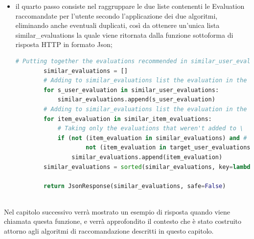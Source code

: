 \begin{itemize}
\begin{lstlisting}[language=Python, label=lst:CF_Hybrid_Evaluation_4]
		similar_item_evaluations = []
		for t_user_evaluation in target_user_evaluations:  # for every target user's evaluations
			for item_evaluation in item_recommendation_alg(t_user_evaluation['other_id']):  # is applied the item_recommendation algorithm
				# Taking only the evaluations that have: different other_id (excluding the target evaluation
				# in the recommendation) and same parent_id and the evaluations that weren't added to 'similar_item_evaluations'
				# list or to 'similar_user_evaluations' or to 'target_user_evaluations'
				if ((t_user_evaluation['other_id'] != item_evaluation['other_id']) and # Evaluations must have different 'id'
						(t_user_evaluation['parent_id'] == item_evaluation['parent_id']) and # Evaluations must have the same 'parent_id'
						# Evaluation in all_other_evals list mustn't be already added to \
						not (item_evaluation in similar_item_evaluations) and # the 'similar_item_evaluations' list,
						not (item_evaluation in similar_user_evaluations) and # the 'similar_user_evaluations' list or
						not (item_evaluation in target_user_evaluations)): # the 'target_user_evaluations' list
					similar_item_evaluations.append(item_evaluation)
	\end{lstlisting} 
	\item il quarto passo consiste nel raggruppare le due liste contenenti le Evaluation raccomandate per l'utente secondo l'applicazione dei
	due algoritmi, eliminando anche eventuali duplicati, così da ottenere un'unica lista similar\_evaluations la quale viene ritornata dalla 
	funzione sottoforma di risposta HTTP in formato Json;
	\begin{lstlisting}[language=Python, label=lst:CF_Hybrid_Evaluation_5]
		# Putting together the evaluations recommended in similar_user_evaluations list and similar_item_evaluations list
		similar_evaluations = []
		# Adding to similar_evaluations list the evaluation in the similar_user_evaluations list
		for s_user_evaluation in similar_user_evaluations:
			similar_evaluations.append(s_user_evaluation)
		# Adding to similar_evaluations list the evaluation in the similar_item_evaluations list
		for item_evaluation in similar_item_evaluations:
			# Taking only the evaluations that weren't added to \
			if (not (item_evaluation in similar_evaluations) and # the 'similar_evaluations' list or
					not (item_evaluation in target_user_evaluations)): # the 'target_user_evaluations' list
				similar_evaluations.append(item_evaluation)
		similar_evaluations = sorted(similar_evaluations, key=lambda i: i['other_id'])

		return JsonResponse(similar_evaluations, safe=False)
	\end{lstlisting} 
\end{itemize}
\ \\
Nel capitolo successivo verrà mostrato un esempio di risposta quando viene chiamata questa funzione, e verrà approfondito il contesto che 
è stato costruito attorno agli algoritmi di raccomandazione descritti in questo capitolo.

